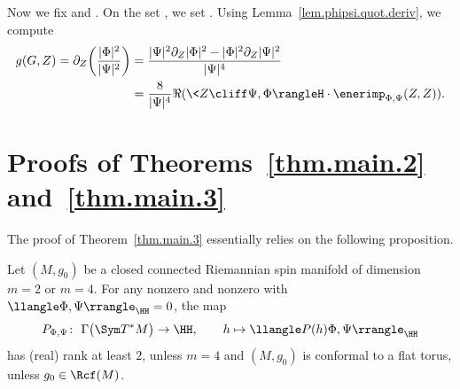 Now we fix  and .
On the set , we set . Using Lemma~\ref{lem.phipsi.quot.deriv}, we compute
\begin{align}
g(G,Z)
=\partial_Z\biggl(\frac{|\Phi|^2}{|\Psi|^2}\biggr)
&=
\frac{|\Psi|^2 \partial_Z |\Phi|^2 - |\Phi|^2 \partial_Z |\Psi|^2}{|\Psi|^4} \nonumber\\
&=
\frac{8}{|\Psi|^4}
\Re (\< Z \cliff \Psi , \Phi \rangleH \cdot\enerimp_{\Phi,\Psi}(Z,Z)) .\label{eq.GZ-prod}
\end{align}

\section{Proofs of Theorems~\ref{thm.main.2} and~\ref{thm.main.3}}
\label{sec.proof.thm.main.2}

The proof of Theorem~\ref{thm.main.3} essentially relies on the following proposition.

\begin{Proposition}\label{prop.rank.two}
Let $(M,g_0)$ be a closed connected Riemannian spin manifold of dimension $m=2$ or $m=4$.
For any nonzero  and nonzero  with $\llangle\Phi,\Psi\rrangle_\HH=0$, the map
\begin{equation}\label{eq.quasi.Q}
 P_{\Phi,\Psi}\colon\ \Gamma\bigl(\Sym T^*M\bigr)\to \HH, \qquad h\mapsto \llangle P(h)\Phi,\Psi\rrangle_\HH
\end{equation}
has (real) rank at least $2$, unless $m=4$ and $(M,g_0)$ is conformal to a flat torus, \ie unless $g_0\in \Rcf(M)$.
\end{Proposition}

